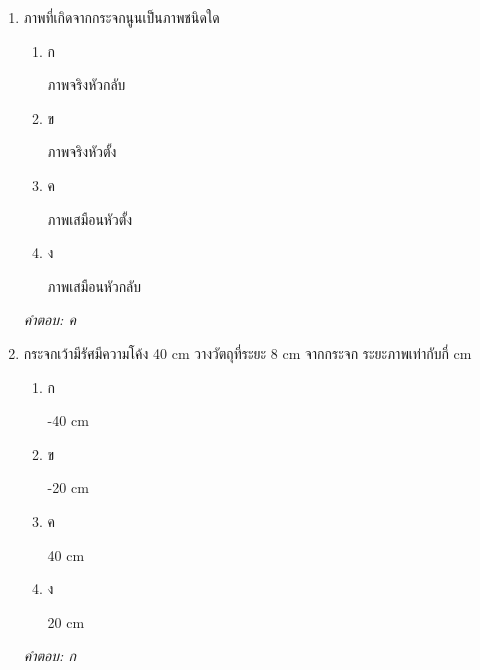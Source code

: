 \documentclass[12pt]{article}
\begin{document}
\begin{enumerate}[label=\arabic*., itemsep=0.5\baselineskip, topsep=0.5\baselineskip, leftmargin=*]
\item ภาพที่เกิดจากกระจกนูนเป็นภาพชนิดใด
\begin{enumerate}[label=\alph*)., itemsep=0.3\baselineskip, topsep=0.3\baselineskip]
\item ก\ 
\begin{minipage}[t]{0.9\linewidth}
\raggedright ภาพจริงหัวกลับ
\end{minipage}
\item ข\ 
\begin{minipage}[t]{0.9\linewidth}
\raggedright ภาพจริงหัวตั้ง
\end{minipage}
\item ค\ 
\begin{minipage}[t]{0.9\linewidth}
\raggedright ภาพเสมือนหัวตั้ง
\end{minipage}
\item ง\ 
\begin{minipage}[t]{0.9\linewidth}
\raggedright ภาพเสมือนหัวกลับ
\end{minipage}
\end{enumerate}
\vspace{-0.3\baselineskip}
\begin{small}
\textit{คำตอบ: ค}
\end{small}

\item กระจกเว้ามีรัศมีความโค้ง 40 cm วางวัตถุที่ระยะ 8 cm จากกระจก ระยะภาพเท่ากับกี่ cm
\begin{enumerate}[label=\alph*)., itemsep=0.3\baselineskip, topsep=0.3\baselineskip]
\item ก\ 
\begin{minipage}[t]{0.9\linewidth}
\raggedright -40 cm
\end{minipage}
\item ข\ 
\begin{minipage}[t]{0.9\linewidth}
\raggedright -20 cm
\end{minipage}
\item ค\ 
\begin{minipage}[t]{0.9\linewidth}
\raggedright 40 cm
\end{minipage}
\item ง\ 
\begin{minipage}[t]{0.9\linewidth}
\raggedright 20 cm
\end{minipage}
\end{enumerate}
\vspace{-0.3\baselineskip}
\begin{small}
\textit{คำตอบ: ก}
\end{small}


\end{enumerate}
\end{document}
